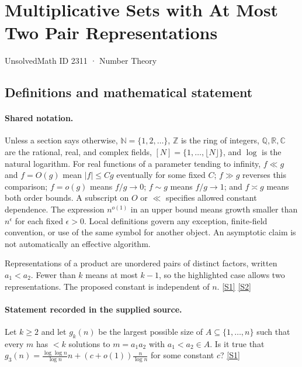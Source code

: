 \documentclass[11pt,a4paper]{article}
\newcommand{\N}{\mathbb{N}}
\newcommand{\Z}{\mathbb{Z}}
\newcommand{\Q}{\mathbb{Q}}
\newcommand{\R}{\mathbb{R}}
\newcommand{\C}{\mathbb{C}}
\newcommand{\sref}[2]{\hyperlink{source:#1:#2}{[S#2]}}
\begin{document}

\setcounter{section}{2310}

\section{Multiplicative Sets with At Most Two Pair Representations}\label{2311}

{\small\sffamily UnsolvedMath ID 2311 · Number Theory}

\subsection{Definitions and mathematical statement}

\paragraph{Shared notation.}Unless a section says otherwise, $\N=\{1,2,\ldots\}$,
$\Z$ is the ring of integers, $\Q,\R,\C$ are the rational, real, and complex
fields, $[N]=\{1,\ldots,\lfloor N\rfloor\}$, and $\log$ is the natural
logarithm. For real functions of a parameter tending to infinity,
$f\ll g$ and $f=O(g)$ mean $|f|\leq Cg$ eventually for some fixed $C$;
$f\gg g$ reverses this comparison; $f=o(g)$ means $f/g\to0$;
$f\sim g$ means $f/g\to1$; and $f\asymp g$ means both order bounds.
A subscript on $O$ or $\ll$ specifies allowed constant dependence.
The expression $n^{o(1)}$ in an upper bound means growth smaller than
$n^\epsilon$ for each fixed $\epsilon>0$. Local definitions govern any
exception, finite-field convention, or use of the same symbol for another
object. An asymptotic claim is not automatically an effective algorithm.



Representations of a product are unordered pairs of distinct factors, written $a_1<a_2$. Fewer than $k$ means at most $k-1$, so the highlighted case allows two representations. The proposed constant is independent of $n$. \sref{2311}{1} \sref{2311}{2}

\paragraph{Statement recorded in the supplied source.}
Let $k\geq 2$ and let $g_k(n)$ be the largest possible size of $A\subseteq \{1,\ldots,n\}$ such that every $m$ has $<k$ solutions to $m=a_1a_2$ with $a_1<a_2\in A$.
Is it true that $ g_3(n)=\frac{\log\log n}{\log n}n+(c+o(1))\frac{n}{\log n} $ for some constant $c$? \sref{2311}{1}
\end{document}
